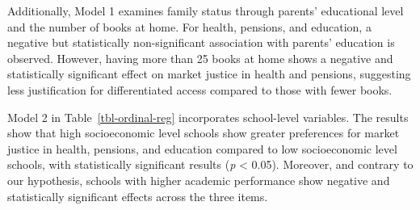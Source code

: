 \documentclass[
  12pt,
  letterpaper,
]{article}
\begin{document}
Additionally, Model 1 examines family status through parents'
educational level and the number of books at home. For health, pensions,
and education, a negative but statistically non-significant association
with parents' education is observed. However, having more than 25 books
at home shows a negative and statistically significant effect on market
justice in health and pensions, suggesting less justification for
differentiated access compared to those with fewer books.

Model 2 in Table~\ref{tbl-ordinal-reg} incorporates school-level
variables. The results show that high socioeconomic level schools show
greater preferences for market justice in health, pensions, and
education compared to low socioeconomic level schools, with
statistically significant results (\emph{p} \textless{} 0.05). Moreover,
and contrary to our hypothesis, schools with higher academic performance
show negative and statistically significant effects across the three
items.
\end{document}
